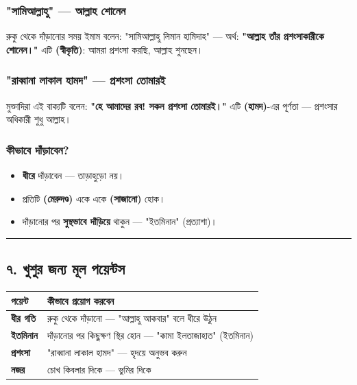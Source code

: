 \subsubsection*{\textbf{"সামিআল্লাহু" — আল্লাহ শোনেন}}
রুকু থেকে দাঁড়ানোর সময় ইমাম বলেন: "সামিআল্লাহু লিমান হামিদাহ" — অর্থ: \textbf{"আল্লাহ তাঁর প্রশংসাকারীকে শোনেন।"} এটি \textbf{ (স্বীকৃতি)}: আমরা প্রশংসা করছি, আল্লাহ শুনছেন।

\subsubsection*{\textbf{"রাব্বানা লাকাল হামদ" — প্রশংসা তোমারই}}
মুক্তাদিরা এই বাক্যটি বলেন: \textbf{"হে আমাদের রব! সকল প্রশংসা তোমারই।"} এটি \textbf{ (হামদ)}-এর পূর্ণতা — প্রশংসার অধিকারী শুধু আল্লাহ।

\subsubsection*{\textbf{কীভাবে দাঁড়াবেন?}}
\begin{itemize}
\item \textbf{ধীরে} দাঁড়াবেন — তাড়াহুড়ো নয়।
\item প্রতিটি \textbf{ (মেরুদণ্ড)} একে একে \textbf{ (সাজানো)} হোক।
\item দাঁড়ানোর পর \textbf{সুস্থভাবে দাঁড়িয়ে} থাকুন — "ইতমিনান" (প্রত্যাশা)।
\end{itemize}
\medskip\hrule\medskip

\subsection*{৭. খুশুর জন্য মূল পয়েন্টস}

\begin{table}[h]\centering\small
\begin{tabular}{ll}
পয়েন্ট & কীভাবে প্রয়োগ করবেন \\
\hline
\textbf{ধীর গতি} & রুকু থেকে দাঁড়ানো — "আল্লাহু আকবার" বলে ধীরে উঠুন \\
\textbf{ইতমিনান} & দাঁড়ানোর পর কিছুক্ষণ স্থির হোন — "কামা ইলতাজাহাত" (ইতমিনান) \\
\textbf{প্রশংসা} & "রাব্বানা লাকাল হামদ" — হৃদয়ে অনুভব করুন \\
\textbf{নজর} & চোখ কিবলার দিকে — ভুমির দিকে \\
\hline
\end{tabular}
\end{table}

